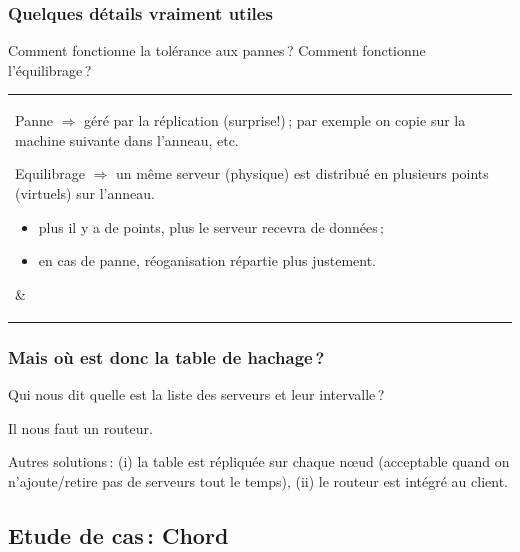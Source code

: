 \begin{frame}
\frametitle{Quelques détails vraiment utiles}

Comment fonctionne la tolérance aux pannes\,? Comment fonctionne l'équilibrage\,?


\vfill

\begin{tabular}{l|p{6cm}}
   \parbox{6cm}{


\alert{Panne} $\Rightarrow$ géré par la réplication (surprise!)\,; 
par exemple on copie sur la machine suivante dans l'anneau, etc.


  \vfill
  
\alert{Equilibrage} $\Rightarrow$ un même serveur (physique) est distribué
en plusieurs points (virtuels) sur l'anneau.

\begin{itemize}
  \item plus il y a de points, plus le serveur recevra de données\,;
  \item en cas de panne, réoganisation répartie plus justement.
\end{itemize}
  
   }  %
  & 
  \parbox{5cm}{ }
\end{tabular}

\end{frame}

\begin{frame}
\frametitle{Mais où est donc la table de hachage\,?}

\alert{Qui nous dit quelle est la liste des serveurs et leur intervalle}\,?

\smallskip

Il nous faut un \alert{routeur}.

\smallskip

\smallskip

Autres solutions\,: (i) la table est répliquée sur chaque n{\oe}ud (acceptable
quand on n'ajoute/retire pas de serveurs tout le temps), (ii) le routeur est intégré au client.



\end{frame}

\subsection{Etude de cas\,: Chord}

